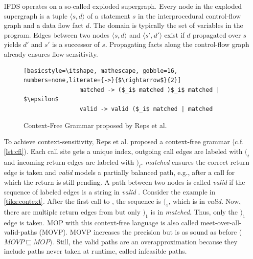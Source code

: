 \documentclass[../draft.tex]{subfiles}
\begin{document}
    IFDS operates on a so-called exploded supergraph. 
    Every node in the exploded supergraph is a tuple $\langle s, d \rangle$ of a statement $s$ in the interprocedural control-flow graph and a data flow fact $d$. 
    The domain is typically the set of variables in the program. 
    Edges between two nodes $\langle s, d \rangle$ and $\langle s', d' \rangle$ exist if $d$ propagated over $s$ yields $d'$ and $s'$ is a successor of $s$. 
    Propagating facts along the control-flow graph already ensures flow-sensitivity.

    \begin{figure}[ht]
        \centering
        \begin{adjustbox}{max width=\columnwidth}
            \begin{lstlisting}[basicstyle=\itshape, mathescape, gobble=16, numbers=none,literate={->}{$\rightarrow$}{2}]
                matched -> ($_i$ matched )$_i$ matched | $\epsilon$
                valid -> valid ($_i$ matched | matched
            \end{lstlisting}
        \end{adjustbox}
        \caption{Context-Free Grammar proposed by Reps et al.\cite{Reps1995}}
        \label{lst:cfl}
    \end{figure}

    To achieve context-sensitivity, Reps et al. proposed a context-free grammar (c.f. \autoref{lst:cfl}). 
    Each call site gets a unique index, outgoing call edges are labeled with $(_i$ and incoming return edges are labeled with $)_i$. 
    \textit{matched} ensures the correct return edge is taken and \textit{valid} models a partially balanced path, e.g., after a call for which the return is still pending.
    A path between two nodes is called \textit{valid} if the sequence of labeled edges is a string in \textit{valid} \cite{Reps1995}. 
    Consider the example in \autoref{tikz:context}. 
    After the first call to , the sequence is $(_1$, which is in \textit{valid}. 
    Now, there are multiple return edges from  but only $)_1$ is in \textit{matched}. 
    Thus, only the $)_1$ edge is taken. 
    MOP with this context-free language is also called meet-over-all-valid-paths (MOVP). MOVP increases the precision but is as sound as before ($\mathit{MOVP} \sqsubseteq \mathit{MOP}$). 
    Still, the valid paths are an overapproximation because they include paths never taken at runtime, called infeasible paths.
\end{document}

